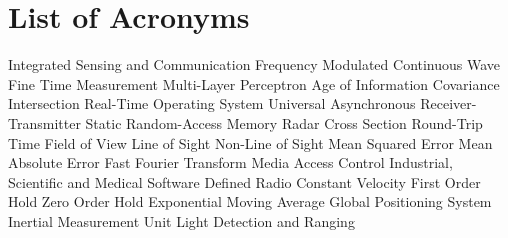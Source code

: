 \documentclass[a4paper, 11pt, oneside]{Thesis-1}
\begin{document}
\listoftables

{}
\chapter*{List of Acronyms}

\begin{acronym}[FreeRTOS]
      {Integrated Sensing and Communication}
      {Frequency Modulated Continuous Wave}
       {Fine Time Measurement}
       {Multi-Layer Perceptron}
       {Age of Information}
        {Covariance Intersection}
      {Real-Time Operating System}
      {Universal Asynchronous Receiver-Transmitter}
      {Static Random-Access Memory}
       {Radar Cross Section}
       {Round-Trip Time}
       {Field of View}
       {Line of Sight}
      {Non-Line of Sight}
       {Mean Squared Error}
       {Mean Absolute Error}
       {Fast Fourier Transform}
       {Media Access Control}
       {Industrial, Scientific and Medical}
       {Software Defined Radio}
        {Constant Velocity}
       {First Order Hold}
       {Zero Order Hold}
       {Exponential Moving Average}
       {Global Positioning System}
       {Inertial Measurement Unit}
     {Light Detection and Ranging}
\end{acronym}

\clearpage

\pagestyle{empty}

\mainmatter
\pagestyle{fancy}




\end{document}
